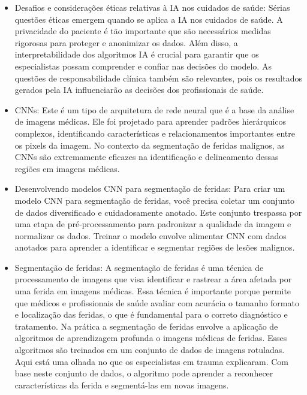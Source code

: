 \begin{itemize}

    \item Desafios e considerações éticas relativas à \ac{IA} nos cuidados de saúde: Sérias questões éticas emergem quando se aplica a \ac{IA} nos cuidados de saúde. A privacidade do paciente é tão importante que são necessários medidas rigorosas para proteger e anonimizar os dados. Além disso, a interpretabilidade dos algoritmos \ac{IA} é crucial para garantir que os especialistas possam comprender e confiar nas decisões do modelo. As questões de responsabilidade clínica também são relevantes, pois os resultados gerados pela \ac{IA} influenciarão as decisões dos profissionais de saúde.

    \item \acp{CNN}: Este é um tipo de arquitetura de rede neural que é a base da análise de imagens médicas. Ele foi projetado para aprender padrões hierárquicos complexos, identificando características e relacionamentos importantes entre os pixels da imagem. No contexto da segmentação de feridas malignos, as \acp{CNN} são extremamente eficazes na identificação e delineamento dessas regiões em imagens médicas.

    \item Desenvolvendo modelos \ac{CNN} para segmentação de feridas: Para criar um modelo \ac{CNN} para segmentação de feridas, você precisa coletar um conjunto de dados diversificado e cuidadosamente anotado. Este conjunto trespassa por uma etapa de pré-processamento para padronizar a qualidade da imagem e normalizar os dados. Treinar o modelo envolve alimentar \ac{CNN} com dados anotados para aprender a identificar e segmentar regiões de lesões malignos.

    \item Segmentação de feridas: A segmentação de feridas é uma técnica de processamento de imagens que visa identificar e rastrear a área afetada por uma ferida em imagens médicas. Essa técnica é importante porque permite que médicos e profissionais de saúde avaliar com acurácia o tamanho formato e localização das feridas, o que é fundamental para o correto diagnóstico e tratamento. Na prática a segmentação de feridas envolve a aplicação de algoritmos de aprendizagem profunda o imagens médicas de feridas. Esses algoritmos são treinados em um conjunto de dados de imagens rotuladas. Aqui está uma olhada no que os especialistas em trauma explicaram. Com base neste conjunto de dados, o algoritmo pode aprender a reconhecer características da ferida e segmentá-las em novas imagens.


\end{itemize}
